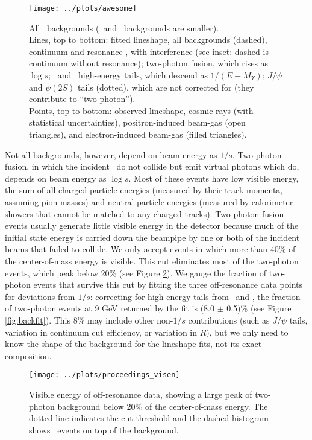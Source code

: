 \documentclass[aps,prd,preprint,superscriptaddress,tightenlines,nofootinbib,floatfix]{revtex4}
\begin{document}
\begin{figure}[p]
  \texttt{[image: ../plots/awesome]}

  \caption{\label{fig:awesome} All \uthree\ backgrounds (\uone\ and
  \utwo\ backgrounds are smaller).  \vspace{0.2 cm} \\
  Lines, top to bottom: fitted lineshape, all backgrounds (dashed),
  continuum and resonance \tautau, with interference (see inset:
  dashed is continuum without resonance); two-photon fusion, which
  rises as $\log s$; \utwo\ and \uone\ high-energy tails, which
  descend as $1/(E-M_\Upsilon)$; $J/\psi$ and $\psi(2S)$ tails
  (dotted), which are not corrected for (they contribute to
  ``two-photon''). \vspace{0.2 cm} \\ Points, top to bottom: observed
  lineshape, cosmic rays (with statistical uncertainties),
  positron-induced beam-gas (open triangles), and electron-induced
  beam-gas (filled triangles).}
\end{figure}

Not all backgrounds, however, depend on beam energy as $1/s$.
Two-photon fusion, in which the incident \ee\ do not collide but emit
virtual photons which do, depends on beam energy as $\log s$.  Most of
these events have low visible energy, the sum of all charged particle
energies (measured by their track momenta, assuming pion masses) and
neutral particle energies (measured by calorimeter showers that cannot
be matched to any charged tracks).  Two-photon fusion events usually
generate little visible energy in the detector because much of the
initial state energy is carried down the beampipe by one or both of
the incident beams that failed to collide.  We only accept events in
which more than 40\% of the center-of-mass energy is visible.  This
cut eliminates most of the two-photon events, which peak below 20\%
(see Figure \ref{fig:visen}).  We gauge the fraction of two-photon
events that survive this cut by fitting the three off-resonance data
points for deviations from $1/s$: correcting for high-energy tails
from \uone\ and \utwo, the fraction of two-photon events at 9 GeV
returned by the fit is (8.0 $\pm$ 0.5)\% (see Figure
\ref{fig:backfit}).  This 8\% may include other non-$1/s$
contributions (such as $J/\psi$ tails, variation in continuum cut
efficiency, or variation in $R$), but we only need to know the shape
of the background for the lineshape fits, not its exact composition.

\begin{figure}[p]
  \begin{center}
    \texttt{[image: ../plots/proceedings\_visen]}
  \end{center}
  \caption{\label{fig:visen} Visible energy of off-resonance data,
    showing a large peak of two-photon background below 20\% of the
    center-of-mass energy.  The dotted line indicates the cut
    threshold and the dashed histogram shows \ups\ events on top of
    the background.}
\end{figure}
\end{document}
